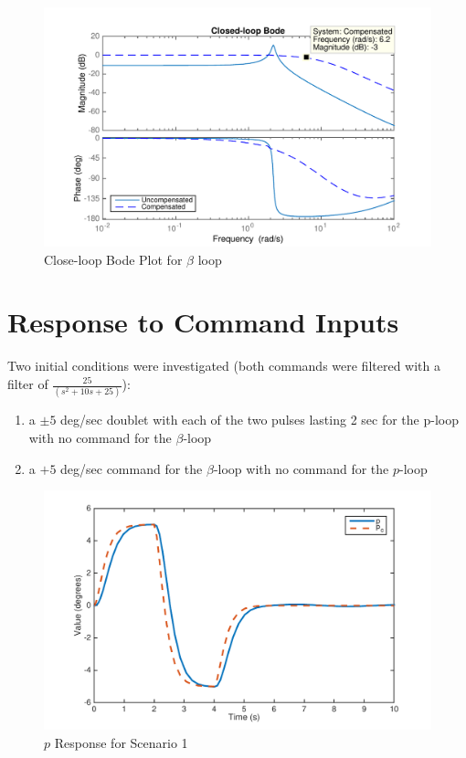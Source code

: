 \documentclass[11pt]{article}
\begin{document}
\begin{figure}[h!]
\begin{center}
\includegraphics[height=.4\textheight]{figures/closeloop_beta}
\caption{Close-loop Bode Plot for $\beta$ loop}
\end{center}
\end{figure}

\clearpage
\section{Response to Command Inputs}
Two initial conditions were investigated (both commands were filtered with a filter of $\frac{25}{(s^2 + 10s + 25)}$):
\begin{enumerate}
\item a $\pm 5$ deg/sec doublet with each of the two pulses lasting 2 sec for the p-loop with no command for the $\beta$-loop
\item a $+ 5$ deg/sec command for the $\beta$-loop with no command for the $p$-loop\\
\end{enumerate}


\begin{figure}[h!]
\begin{center}
\includegraphics[height=.32\textheight]{figures/p2}
\caption{$p$ Response for Scenario 1}
\end{center}
\end{figure}
\end{document}
